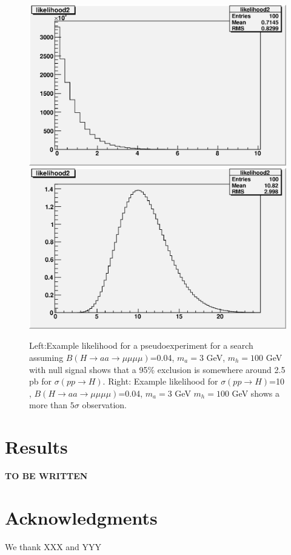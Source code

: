 \documentclass[aps,12pt,superscriptaddress,nofootinbib,floatfix,showpacs]{revtex4}
\begin{document}
\begin{figure}[htb]
\begin{center}
\includegraphics[width=0.48\linewidth]{plots/likelihood_NoSignal.eps}
\includegraphics[width=0.48\linewidth]{plots/likelihood_H100_a3_10pb.eps}
\caption{Left:Example likelihood for a pseudoexperiment for a search assuming $B(H \to aa \to \mu \mu \mu \mu)$=0.04, 
$m_a=3$ GeV, $m_h= 100$ GeV with null signal shows that a 95\% exclusion is somewhere around 2.5 pb for  
$\sigma (pp \to H)$. Right: Example likelihood for $\sigma (pp \to H)$=10 \ipb, $B(H \to aa \to \mu \mu \mu \mu)$=0.04, $m_a=3$ GeV 
$m_h= 100$ GeV shows a more than $5 \sigma$ observation.}
\label{likelihood_10pb}
\end{center}
\end{figure}


\section{Results}

{\bf TO BE WRITTEN}

 




%
\section*{Acknowledgments}
We thank XXX and YYY

%
%

\def\Journal#1#2#3#4{{#1} {\bf #2}, #3 (#4)}
\def\NCA{Nuovo Cimento}
\def\NIM{Nucl. Instrum. Methods}
\def\NIMA{{Nucl. Instrum. Methods} A}
\def\NP{Nucl. Phys.} 
\def\NPB{{Nucl. Phys.} B}
\def\PLB{{Phys. Lett.}  B}
\def\PRL{Phys. Rev. Lett.}
\def\RPP{Rep. Prog. Phys.}
\def\PRD{{Phys. Rev.} D}
\def\PR{Phys. Rep.}
\def\PRP{Prog. Theor. Phys.}
\def\ZPC{{Z. Phys.} C}
\def\MPL{{Mod. Phys. Lett.} A}
\def\EPJC{{Eur. Phys. J.} C}
\def\CPC{Comput. Phys. Commun.}
\end{document}
